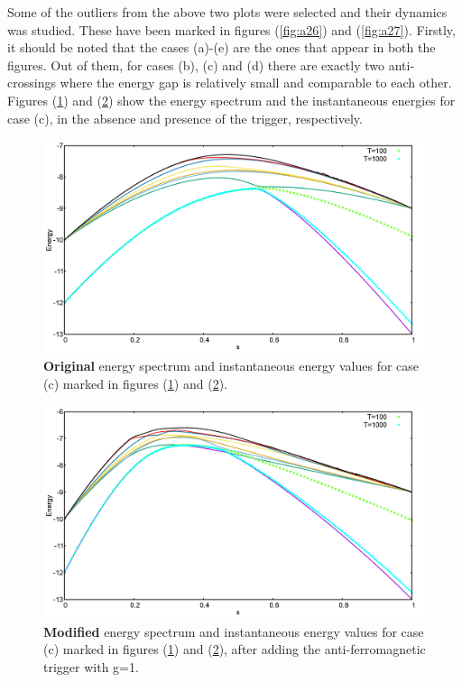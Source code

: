 \documentclass[../main.tex]{subfiles}
\begin{document}
Some of the outliers from the above two plots were selected and their dynamics was studied. These have been marked in figures (\ref{fig:a26}) and (\ref{fig:a27}).  Firstly, it should be noted that the cases (a)-(e) are the ones that appear in both the figures. Out of them, for cases (b), (c) and (d) there are exactly two anti-crossings where the energy gap is relatively small and comparable to each other. Figures (\ref{fig:a28}) and (\ref{fig:a29}) show the energy spectrum and the instantaneous energies for case (c), in the absence and presence of the trigger, respectively.

\begin{figure}[H]
\centering 
\includegraphics[scale=0.3]{441_O_T100_1000.png}
\caption{\textbf{Original} energy spectrum and instantaneous energy values for case (c) marked in figures (\ref{fig:a28}) and (\ref{fig:a29}).}
\label{fig:a28}
\end{figure}
\begin{figure}[H]
\centering 
\includegraphics[scale=0.3]{441_A_g1_T100_1000.png}
\caption{\textbf{Modified} energy spectrum and instantaneous energy values for case (c) marked in figures (\ref{fig:a28}) and (\ref{fig:a29}), after adding the anti-ferromagnetic trigger with g=1.}
\label{fig:a29}
\end{figure}
\end{document}
